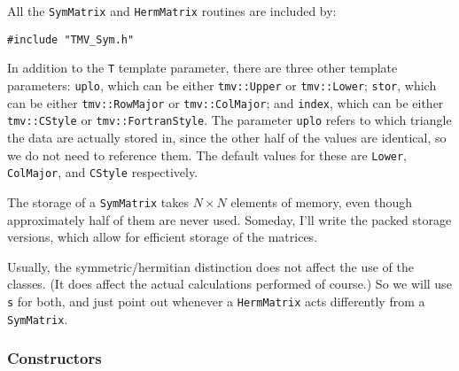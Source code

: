 \documentclass[twoside,letterpaper,11pt]{article}
\renewcommand{\tt}[1]{{\texttt {#1}}}
\begin{document}
All the \tt{SymMatrix} and \tt{HermMatrix} routines are included by:
\begin{verbatim}
#include "TMV_Sym.h"
\end{verbatim}

In addition to the \tt{T} template parameter, there are three other template 
parameters: \tt{uplo}, which can be either \tt{tmv::Upper} or \tt{tmv::Lower};
\tt{stor}, which can be either \tt{tmv::RowMajor} or \tt{tmv::ColMajor}; and
\tt{index}, which can be either \tt{tmv::CStyle} or \tt{tmv::FortranStyle}.
The parameter \tt{uplo} refers to which triangle the data are actually stored in, 
since the
other half of the values are identical, so we do not need to reference them.
The default values for these are \tt{Lower}, \tt{ColMajor}, and \tt{CStyle}
respectively.

The storage of a \tt{SymMatrix} takes
$N \times N$ elements of memory, even though approximately half of them 
are never used.  Someday, I'll write the packed storage versions, which allow for
efficient storage of the matrices.

Usually, the symmetric/hermitian distinction does not affect the use of the classes.
(It does affect the actual calculations performed of course.)  So we will use 
\tt{s} for both, and just point out whenever a \tt{HermMatrix} acts differently
from a \tt{SymMatrix}.

\subsubsection{Constructors}
\end{document}
